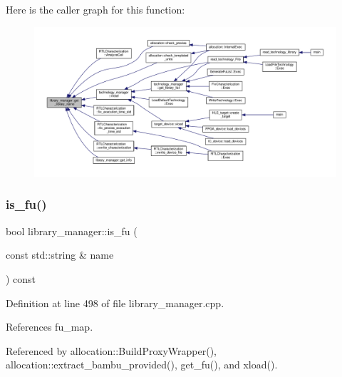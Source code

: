 Here is the caller graph for this function\+:
\nopagebreak
\begin{figure}[H]
\begin{center}
\leavevmode
\includegraphics[width=350pt]{d8/d35/classlibrary__manager_a7e17dbc69eacaabce39da9168451c3c8_icgraph}
\end{center}
\end{figure}
\mbox{\label{classlibrary__manager_a8b79f093ebc0949d2e87ba84e185a361}} 
\subsubsection{\texorpdfstring{is\+\_\+fu()}{is\_fu()}}
{\footnotesize\ttfamily bool library\+\_\+manager\+::is\+\_\+fu (\begin{DoxyParamCaption}\item[{const std\+::string \&}]{name }\end{DoxyParamCaption}) const}



Definition at line 498 of file library\+\_\+manager.\+cpp.



References fu\+\_\+map.



Referenced by allocation\+::\+Build\+Proxy\+Wrapper(), allocation\+::extract\+\_\+bambu\+\_\+provided(), get\+\_\+fu(), and xload().

